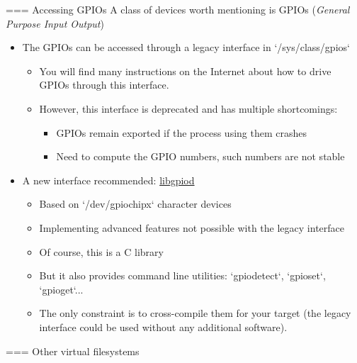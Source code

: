 === {Accessing GPIOs}
  A class of devices worth mentioning is GPIOs ({\em General Purpose Input Output})
  \begin{itemize}
  \item The GPIOs can be accessed through a legacy interface in
        `/sys/class/gpios`
    \begin{itemize}
       \item You will find many instructions on the Internet about how
	     to drive GPIOs through this interface.
       \item However, this interface is deprecated and has multiple
             shortcomings:
             \begin{itemize}
		\item GPIOs remain exported if the process using them crashes
		\item Need to compute the GPIO numbers, such numbers are not stable
	     \end{itemize}
    \end{itemize}
  \item A new interface recommended: \href{https://git.kernel.org/pub/scm/libs/libgpiod/libgpiod.git/}{libgpiod}
    \begin{itemize}
	\item Based on `/dev/gpiochipx` character devices
        \item Implementing advanced features not possible with the legacy interface
	\item Of course, this is a C library
        \item But it also provides command line utilities:
              `gpiodetect`, `gpioset`, `gpioget`...
	\item The only constraint is to cross-compile them for your target
	      (the legacy interface could be used without any additional software).
    \end{itemize}
  \end{itemize}


=== {Other virtual filesystems}


